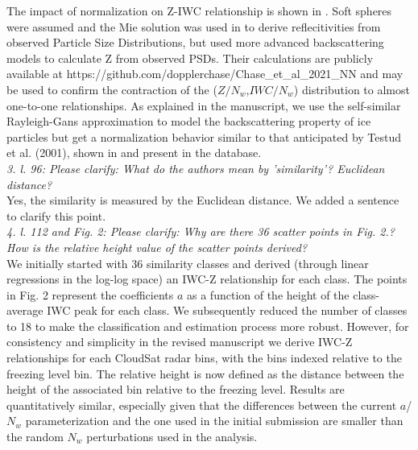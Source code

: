 \documentclass[12pt]{article}
\begin{document}
\newline
The impact of normalization on Z-IWC relationship is shown in \cite{delanoe2014}. Soft spheres were assumed and the Mie solution was used in \cite{delanoe2014}
to derive reflecitivities from observed Particle Size Distributions, but \cite{chase2021}  used more advanced backscattering models to calculate Z from
observed PSDs.  Their calculations are publicly available at https://github.com/dopplerchase/Chase\_et\_al\_2021\_NN and may be used to confirm the contraction
of the ($Z/N_w$,$IWC/N_w$) distribution to almost one-to-one relationships.  As explained in the manuscript, we use the self-similar Rayleigh-Gans approximation
to model the backscattering property of ice particles but get a normalization behavior similar to that anticipated by Testud et al. (2001),
shown in \cite{delanoe2014} and present in the \cite{chase2021} database.\\
\newline
\textit{3. l. 96: Please clarify: What do the authors mean by 'similarity'? Euclidean distance?}\\
\newline
Yes, the similarity is measured by the Euclidean distance.  We added a sentence to clarify this point.\\
\newline    
\textit{4. l. 112 and Fig. 2: Please clarify: Why are there 36 scatter points in Fig. 2.? How is the relative height value 
    of the scatter points derived?}\\
\newline
We initially started with 36 similarity classes and derived (through linear regressions in the log-log space) 
an IWC-Z relationship for each class. The points in Fig. 2 represent 
the coefficients $a$ as a function of the height of the class-average IWC peak for each class. We subsequently reduced the number of classes 
to 18 to make the classification and 
estimation process more robust. However, for consistency and simplicity in the revised manuscript we derive IWC-Z relationships 
for each CloudSat radar bins, with the bins indexed relative to the freezing level bin.  The relative height is now defined as the distance
between the height of the associated bin relative to the freezing level.  Results are quantitatively similar, especially given that the
differences between the current $a$/$N_w$ parameterization and the one used in the initial submission are smaller than the random
$N_w$ perturbations used in the analysis.\\
\end{document}
